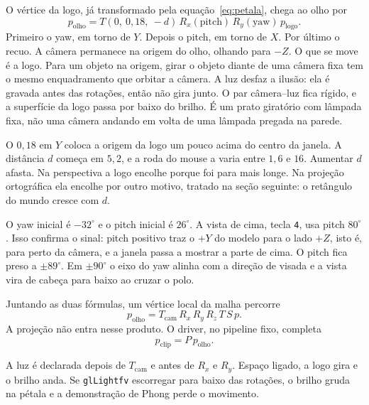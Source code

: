 \documentclass[11pt,a4paper]{article}
\newcommand{\fn}[1]{\texttt{\nobreak\hspace{0pt}#1}}
\begin{document}
O vértice da logo, já transformado pela equação~\eqref{eq:petala}, chega ao olho por
\begin{equation}
  p_{\text{olho}} = T(0,\ 0{,}18,\ -d)\, R_x(\text{pitch})\, R_y(\text{yaw})\, p_{\text{logo}} .
  \label{eq:camera}
\end{equation}
Primeiro o yaw, em torno de \(Y\). Depois o pitch, em torno de \(X\). Por último o recuo. A câmera permanece na origem do olho, olhando para \(-Z\). O que se move é a logo. Para um objeto na origem, girar o objeto diante de uma câmera fixa tem o mesmo enquadramento que orbitar a câmera. A luz desfaz a ilusão: ela é gravada antes das rotações, então não gira junto. O par câmera--luz fica rígido, e a superfície da logo passa por baixo do brilho. É um prato giratório com lâmpada fixa, não uma câmera andando em volta de uma lâmpada pregada na parede.

O \(0{,}18\) em \(Y\) coloca a origem da logo um pouco acima do centro da janela. A distância \(d\) começa em \(5{,}2\), e a roda do mouse a varia entre \(1{,}6\) e \(16\). Aumentar \(d\) afasta. Na perspectiva a logo encolhe porque foi para mais longe. Na projeção ortográfica ela encolhe por outro motivo, tratado na seção seguinte: o retângulo do mundo cresce com \(d\).

O yaw inicial é \(-32^\circ\) e o pitch inicial é \(26^\circ\). A vista de cima, tecla \fn{4}, usa pitch \(80^\circ\). Isso confirma o sinal: pitch positivo traz o \(+Y\) do modelo para o lado \(+Z\), isto é, para perto da câmera, e a janela passa a mostrar a parte de cima. O pitch fica preso a \(\pm 89^\circ\). Em \(\pm 90^\circ\) o eixo do yaw alinha com a direção de visada e a vista vira de cabeça para baixo ao cruzar o polo.

Juntando as duas fórmulas, um vértice local da malha percorre
\begin{equation}
  p_{\text{olho}}
  = T_{\text{cam}}\, R_x\, R_y\, R_z\, T\, S\, p .
  \label{eq:cadeia}
\end{equation}
A projeção não entra nesse produto. O driver, no pipeline fixo, completa
\[
  p_{\text{clip}} = P\, p_{\text{olho}} .
\]

\begin{voz}
A luz é declarada depois de \(T_{\text{cam}}\) e antes de \(R_x\) e \(R_y\). Espaço ligado, a logo gira e o brilho anda. Se \fn{glLightfv} escorregar para baixo das rotações, o brilho gruda na pétala e a demonstração de Phong perde o movimento.
\end{voz}
\end{document}
